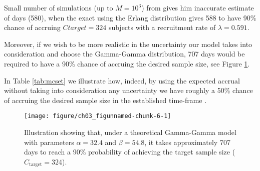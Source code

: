 Small number of simulations (up to $M=10^3$) from \cite{carter2004application} gives him inaccurate estimate of days (580), when the exact using the Erlang distribution gives  588 to have 90\% chance of accruing $Ctarget = 324$ subjects with a recruitment rate of $\lambda=0.591$.

Moreover, if we wish to be more realistic in the uncertainty our model takes into consideration and choose the Gamma-Gamma distribution, 707 days would be required to have a 90\% chance of accruing the desired sample size, see Figure \ref{fig:3_5}. 

In Table \ref{tab:mcset} we illustrate how, indeed, by using the expected accrual without taking into consideration any uncertainty we have roughly a 50\% chance of accruing the desired sample size in the established time-frame \citep{carter2004application}.


\begin{figure}
\begin{knitrout}
\color{fgcolor}
\texttt{[image: figure/ch03\_figunnamed-chunk-6-1]} 
\end{knitrout}
\caption{Illustration showing that, under a theoretical Gamma-Gamma model with parameters $\alpha = 32.4$ and $\beta = 54.8$, it takes approximately 707 days to reach a 90\% probability of achieving the target sample size ($C_{\text{target}} = 324$).}
\label{fig:3_5}
\end{figure}
